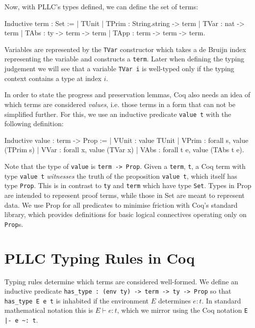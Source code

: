 \documentclass[]{unswthesis}
\newcommand{\types}{\vdash}
\let\c\texttt
\let\i\textit
\begin{document}
Now, with PLLC's types defined, we can define the set of terms:

\begin{coqcode}
Inductive term : Set :=
  | TUnit
  | TPrim : String.string -> term
  | TVar : nat -> term
  | TAbs : ty -> term -> term
  | TApp : term -> term -> term.
\end{coqcode}

Variables are represented by the \c{TVar} constructor which takes a de Bruijn index representing the variable and constructs a \c{term}. Later when defining the typing judgement we will see that a variable \c{TVar i} is well-typed only if the typing context contains a type at index $i$.

In order to state the progress and preservation lemmas, Coq also needs an idea of which terms are considered \i{values}, i.e. those terms in a form that can not be simplified further. For this, we use an inductive predicate \c{value t} with the following definition:

\begin{coqcode}
Inductive value : term -> Prop :=
  | VUnit : value TUnit
  | VPrim : forall s, value (TPrim s)
  | VVar : forall x, value (TVar x)
  | VAbs : forall t e, value (TAbs t e).
\end{coqcode}

Note that the type of \c{value} is \c{term -> Prop}. Given a \c{term}, \c{t}, a Coq term with type \c{value t} \i{witnesses} the truth of the proposition \c{value t}, which itself has type \c{Prop}. This is in contrast to \c{ty} and \c{term} which have type \c{Set}. Types in Prop are intended to represent proof terms, while those in Set are meant to represent data. We use Prop for all predicates to minimise friction with Coq's standard library, which provides definitions for basic logical connectives operating only on \c{Prop}s.

\section{PLLC Typing Rules in Coq}
\label{app:pllc-typing-rules}

Typing rules determine which terms are considered well-formed. We define an inductive predicate \c{has_type : (env ty) -> term -> ty -> Prop} so that \c{has_type E e t} is inhabited if the environment $E$ determines $e : t$. In standard mathematical notation this is $E \types e : t$, which we mirror using the Coq notation \c{E |- e \textasciitilde: t}.
\end{document}
